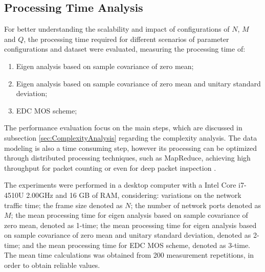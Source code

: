 \documentclass[review]{elsarticle}
\begin{document}
\subsection{Processing Time Analysis}
\label{sec:ProcessingAnalysis}
For better understanding the scalability and impact of configurations of $N$, $M$ and $Q$, the processing time required for different scenarios of parameter configurations and dataset were evaluated, measuring the processing time of: 

\begin{enumerate}
	\item Eigen analysis based on sample covariance of zero mean;
	\item Eigen analysis based on sample covariance of zero mean and unitary standard deviation;
	\item EDC MOS scheme;
\end{enumerate}

The performance evaluation focus on the main steps, which are discussed in subsection \ref{sec:ComplexityAnalysis} regarding the complexity analysis. The data modeling is also a time consuming step, however its processing can be optimized through distributed processing techniques, such as MapReduce, achieving high throughput for packet counting or even for deep packet inspection \cite{Vieira2013}.

The experiments were performed in a desktop computer with a Intel Core i7-4510U 2.00GHz and 16 GB of RAM, considering: variations on the network traffic time; the frame size denoted as $N$; the number of network ports denoted as $M$; the mean processing time for eigen analysis based on sample covariance of zero mean, denoted as 1-time; the mean processing time for eigen analysis based on sample covariance of zero mean and unitary standard deviation, denoted as 2-time; and the mean processing time for EDC MOS scheme, denoted as 3-time. The mean time calculations was obtained from 200 measurement repetitions, in order to obtain reliable values.
\end{document}
